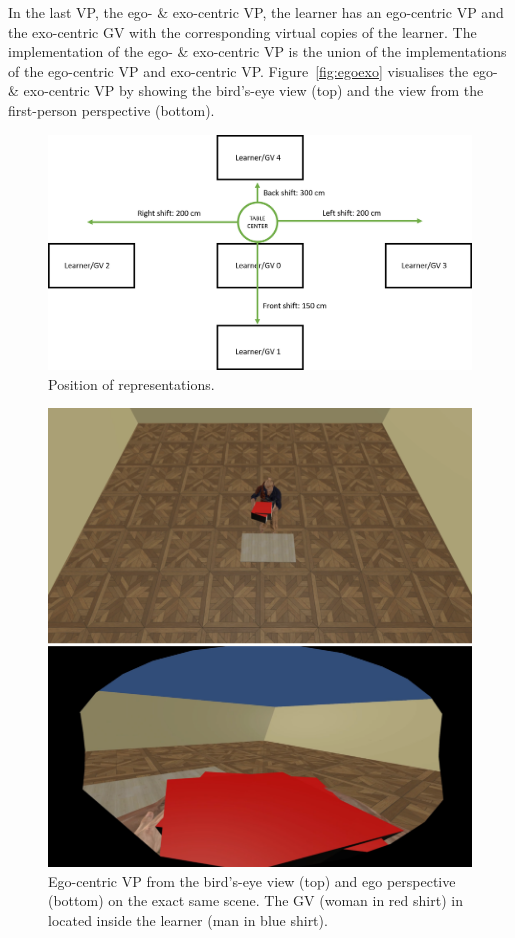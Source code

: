 In the last VP, the ego- \& exo-centric VP, the learner has an ego-centric VP and the exo-centric GV with the corresponding virtual copies of the learner. The implementation of the ego- \& exo-centric VP is the union of the implementations of the ego-centric VP and exo-centric VP. Figure~\ref{fig:egoexo} visualises the ego- \& exo-centric VP by showing the bird's-eye view (top) and the view from the first-person perspective (bottom).\\
\begin{figure}[htb]
	\centering
	\includegraphics[width=\textwidth]{figures/positions.png}
	\caption[Positions of representations.]{Position of representations.}
	\label{fig:multireppositions}
\end{figure}
\begin{figure}[H]
	\centering
	\includegraphics[width=\textwidth]{figures/perspectiveEGO.png}
	\caption[Ego-centric visual perspective]{Ego-centric VP from the bird's-eye view (top) and ego perspective (bottom) on the exact same scene. The GV (woman in red shirt) in located inside the learner (man in blue shirt).}
	\label{fig:ego}
\end{figure}
